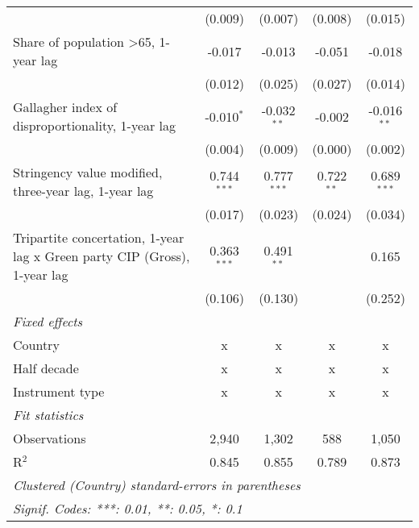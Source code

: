 \begin{table}[htbp]
\begin{tabular}{lcccc}
                                                                                & (0.009)        & (0.007)         & (0.008)         & (0.015)\\   
      Share of population >65, 1-year lag                                       & -0.017         & -0.013          & -0.051          & -0.018\\   
                                                                                & (0.012)        & (0.025)         & (0.027)         & (0.014)\\   
      Gallagher index of disproportionality, 1-year lag                         & -0.010$^{*}$   & -0.032$^{**}$   & -0.002          & -0.016$^{**}$\\   
                                                                                & (0.004)        & (0.009)         & (0.000)         & (0.002)\\   
      Stringency value modified, three-year lag, 1-year lag                     & 0.744$^{***}$  & 0.777$^{***}$   & 0.722$^{**}$    & 0.689$^{***}$\\   
                                                                                & (0.017)        & (0.023)         & (0.024)         & (0.034)\\   
      Tripartite concertation, 1-year lag x Green party CIP (Gross), 1-year lag & 0.363$^{***}$  & 0.491$^{**}$    &                 & 0.165\\   
                                                                                & (0.106)        & (0.130)         &                 & (0.252)\\   
      \emph{Fixed effects}\\
      Country                                                                   & x              & x               & x               & x\\  
      Half decade                                                               & x              & x               & x               & x\\  
      Instrument type                                                           & x              & x               & x               & x\\  
      \midrule \emph{Fit statistics}\\
      Observations                                                              & 2,940          & 1,302           & 588             & 1,050\\  
      R$^2$                                                                     & 0.845          & 0.855           & 0.789           & 0.873\\  
      \midrule
      \multicolumn{5}{l}{\emph{Clustered (Country) standard-errors in parentheses}}\\
      \multicolumn{5}{l}{\emph{Signif. Codes: ***: 0.01, **: 0.05, *: 0.1}}\\
   \end{tabular}
\end{table}


